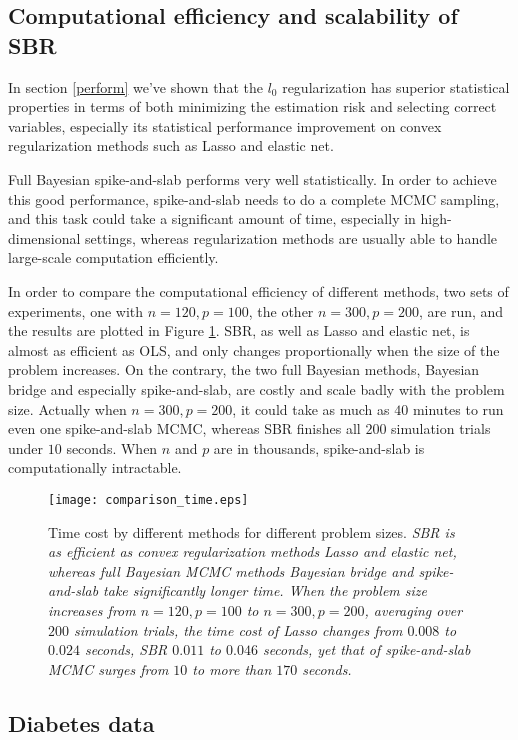 \documentclass[11pt]{article}%
\numberwithin{equation}{section}
\theoremstyle{plain}
\begin{document}
\subsection{Computational efficiency and scalability of SBR}

In section \ref{perform} we've shown that the $l_0$ regularization has superior statistical properties in terms of both minimizing the estimation risk and selecting correct variables, especially its statistical performance improvement on convex regularization methods such as Lasso and elastic net.

Full Bayesian spike-and-slab performs very well statistically.  In order to achieve this good performance, spike-and-slab needs to do a complete MCMC sampling, and this task could take a significant amount of time, especially in high-dimensional settings, whereas regularization methods are usually able to handle large-scale computation efficiently.

In order to compare the computational efficiency of different methods, two sets of experiments, one with $n = 120, p = 100$, the other $n = 300, p = 200$, are run, and the results are plotted in Figure \ref{fig:time}.  SBR, as well as Lasso and elastic net, is almost as efficient as OLS, and only changes proportionally when the size of the problem increases.  On the contrary, the two full Bayesian methods, Bayesian bridge and especially spike-and-slab, are costly and scale badly with the problem size.  Actually when $n = 300, p = 200$, it could take as much as $40$ minutes to run even one spike-and-slab MCMC, whereas SBR finishes all $200$ simulation trials under $10$ seconds.  When $n$ and $p$ are in thousands, spike-and-slab is computationally intractable.

\begin{figure}[!htb]
\centering
\texttt{[image: comparison\_time.eps]}
  \caption{Time cost by different methods for different problem sizes.  \textit{SBR is as efficient as convex regularization methods Lasso and elastic net, whereas full Bayesian MCMC methods Bayesian bridge and spike-and-slab take significantly longer time.  When the problem size increases from $n = 120, p = 100$ to $n = 300, p = 200$, averaging over $200$ simulation trials, the time cost of Lasso changes from $0.008$ to $0.024$ seconds,  SBR $0.011$ to $0.046$ seconds, yet that of spike-and-slab MCMC surges from $10$ to more than $170$ seconds.}}
\label{fig:time}
\end{figure}

\subsection{Diabetes data \label{diabetes}}
\end{document}
